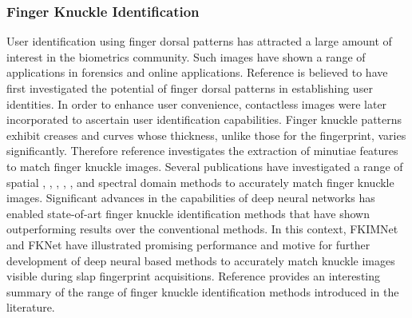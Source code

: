 \subsubsection{Finger Knuckle Identification\label{relate-work-fk}} 
User identification using finger dorsal patterns has attracted a large amount of interest in the biometrics community. Such images have shown a range of applications in forensics and online applications. Reference \cite{joshi1998computer} is believed to have first investigated the potential of finger dorsal patterns in establishing user identities. In order to enhance user convenience, contactless images were later incorporated to ascertain user identification capabilities. Finger knuckle patterns exhibit creases and curves whose thickness, unlike those for the fingerprint, varies significantly. Therefore reference \cite{kumar2015recovering} investigates the extraction of minutiae features to match finger knuckle images. Several publications have investigated a range of spatial \cite{woodard2005finger}, \cite{sricharan2006knuckle}, \cite{kumar2009personal}, \cite{zhang2010online}, \cite{zhu2010multimodal}, and spectral domain \cite{aoyama2011finger} methods to accurately match finger knuckle images. Significant advances in the capabilities of deep neural networks has enabled state-of-art finger knuckle identification methods that have shown outperforming results over the conventional methods. In this context, FKIMNet \cite{thapar2019fkimnet} and FKNet \cite{cheng2020deep} have illustrated promising performance and motive for further development of deep neural based methods to accurately match knuckle images visible during slap fingerprint acquisitions. Reference \cite{jaswal2016knuckle} provides an interesting summary of the range of finger knuckle identification methods introduced in the literature. 



